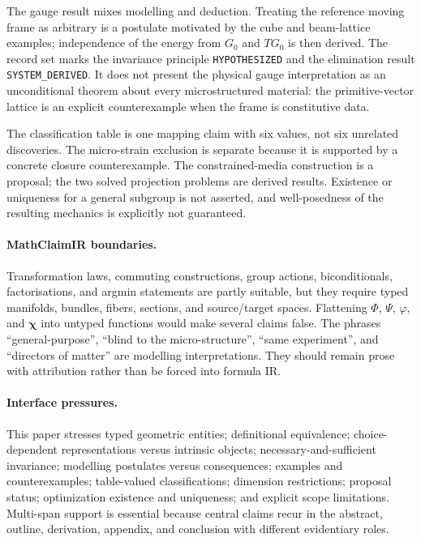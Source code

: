 The gauge result mixes modelling and deduction. Treating the reference moving frame as arbitrary is a postulate motivated by the cube and beam-lattice examples; independence of the energy from $G_0$ and $TG_0$ is then derived. The record set marks the invariance principle \texttt{HYPOTHESIZED} and the elimination result \texttt{SYSTEM\_DERIVED}. It does not present the physical gauge interpretation as an unconditional theorem about every microstructured material: the primitive-vector lattice is an explicit counterexample when the frame is constitutive data.

The classification table is one mapping claim with six values, not six unrelated discoveries. The micro-strain exclusion is separate because it is supported by a concrete closure counterexample. The constrained-media construction is a proposal; the two solved projection problems are derived results. Existence or uniqueness for a general subgroup is not asserted, and well-posedness of the resulting mechanics is explicitly not guaranteed.

\paragraph{MathClaimIR boundaries.}
Transformation laws, commuting constructions, group actions, biconditionals, factorisations, and argmin statements are partly suitable, but they require typed manifolds, bundles, fibers, sections, and source/target spaces. Flattening $\Phi$, $\Psi$, $\varphi$, and $\boldsymbol\chi$ into untyped functions would make several claims false. The phrases ``general-purpose'', ``blind to the micro-structure'', ``same experiment'', and ``directors of matter'' are modelling interpretations. They should remain prose with attribution rather than be forced into formula IR.

\paragraph{Interface pressures.}
This paper stresses typed geometric entities; definitional equivalence; choice-dependent representations versus intrinsic objects; necessary-and-sufficient invariance; modelling postulates versus consequences; examples and counterexamples; table-valued classifications; dimension restrictions; proposal status; optimization existence and uniqueness; and explicit scope limitations. Multi-span support is essential because central claims recur in the abstract, outline, derivation, appendix, and conclusion with different evidentiary roles.

